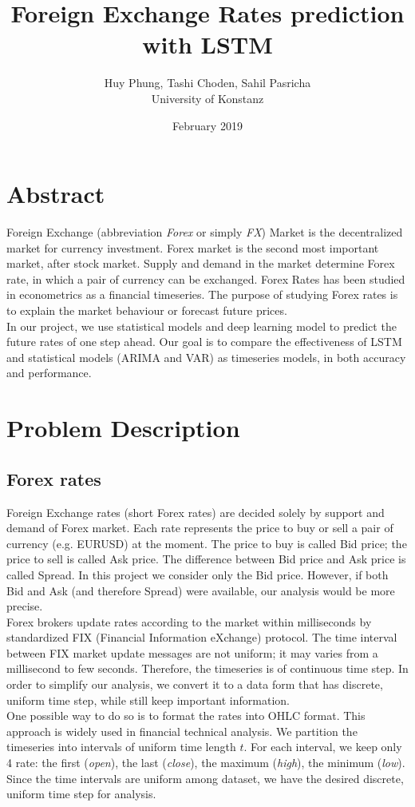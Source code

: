 \documentclass[11pt]{article}
\title{Foreign Exchange Rates prediction with LSTM}
\author{Huy Phung, Tashi Choden, Sahil Pasricha
  \\University of Konstanz}
\date{February 2019}
\begin{document}
\maketitle
\pagebreak
\tableofcontents
\pagebreak

\section{Abstract}
Foreign Exchange (abbreviation \textit{Forex} or simply \textit{FX}) Market is
the decentralized market for currency investment. Forex market is the second
most important market, after stock market. Supply and demand in the market
determine Forex rate, in which a pair of currency can be exchanged. Forex Rates
has been studied in econometrics as a financial timeseries. The purpose of
studying Forex rates is to explain the market behaviour or forecast future
prices.\\
In our project, we use statistical models and deep learning model to predict the
future rates of one step ahead. Our goal is to compare the effectiveness of LSTM
and statistical models (ARIMA and VAR) as timeseries models, in both accuracy
and performance.


\section{Problem Description}
\subsection{Forex rates}
Foreign Exchange rates (short Forex rates) are decided solely by support and
demand of Forex market. Each rate represents the price to buy or sell a pair of
currency (e.g. EURUSD) at the moment. The price to buy is called Bid price; the
price to sell is called Ask price. The difference between Bid price and Ask
price is called Spread. In this project we consider only the Bid price. However,
if both Bid and Ask (and therefore Spread) were available, our analysis would be
more precise.\\
Forex brokers update rates according to the market within milliseconds by
standardized FIX (Financial Information eXchange) protocol. The time interval
between FIX market update messages are not uniform; it may varies from a
millisecond to few seconds. Therefore, the timeseries is of continuous time
step. In order to simplify our analysis, we convert it to a data form that has
discrete, uniform time step, while still keep important information.\\
One possible way to do so is to format the rates into OHLC format. This approach
is widely used in financial technical analysis. We partition the timeseries into
intervals of uniform time length $t$. For each interval, we keep only 4 rate:
the first (\textit{open}), the last (\textit{close}), the maximum
(\textit{high}), the minimum (\textit{low}). Since the time intervals are
uniform among dataset, we have the desired discrete, uniform time step for
analysis.
\end{document}
